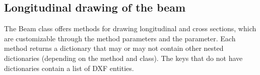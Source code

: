 \documentclass[a4paper,10pt,english]{sphinxmanual}
\begin{document}
\begin{sphinxVerbatim}[commandchars=\\\{\}]
  
             
               
            \PYG{p}{[}   \PYG{p}{]}
            \PYG{p}{[} \PYG{p}{]}
            \PYG{p}{[} \PYG{p}{]}
\end{sphinxVerbatim}


\subsection{Longitudinal drawing of the beam}
\label{\detokenize{usage:longitudinal-drawing-of-the-beam}}
\sphinxAtStartPar
The Beam class offers methods for drawing longitudinal and cross sections, which are customizable through the method
parameters and the  parameter.
Each method returns a dictionary that may or may not contain other nested dictionaries (depending on the method and
class). The keys that do not have dictionaries contain a list of DXF entities.

\begin{sphinxVerbatim}[commandchars=\\\{\}]
\end{sphinxVerbatim}
\end{document}

